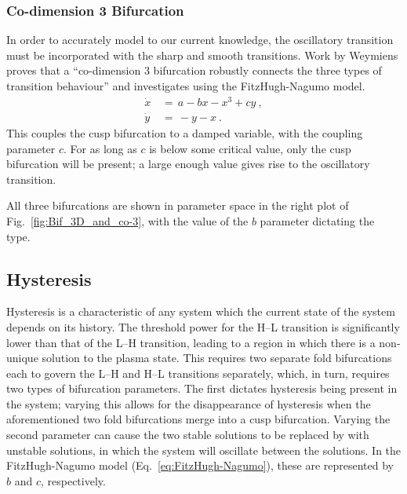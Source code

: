 \subsubsection{Co-dimension 3 Bifurcation}
In order to accurately model to our current knowledge, the oscillatory transition must be incorporated with the sharp and smooth transitions.
Work by Weymiens \cite{weymiens_bifurcation_2014} proves that a ``co-dimension 3 bifurcation robustly connects the three types of transition behaviour'' and investigates using the FitzHugh-Nagumo model.
\begin{subequations}
\begin{align} %
	\dot{x} \,&=\, a - bx - x^3 + cy~, \\
	\dot{y} \,&=\, -y - x~.
\end{align}
	\label{eq:FitzHugh-Nagumo}
\end{subequations}
This couples the cusp bifurcation to a damped variable, with the coupling parameter $c$.
For as long as $c$ is below some critical value, only the cusp bifurcation will be present; a large enough value gives rise to the oscillatory transition.

All three bifurcations are shown in parameter space in the right plot of Fig.~\ref{fig:Bif_3D_and_co-3}, with the value of the $b$ parameter dictating the type.

\subsection{Hysteresis}\label{ssec:hysteresis}
Hysteresis is a characteristic of any system which the current state of the system depends on its history.
The threshold power for the H--L transition is significantly lower than that of the L--H transition, leading to a region in which there is a non-unique solution to the plasma state.
This requires two separate fold bifurcations each to govern the L--H and H--L transitions separately, which, in turn, requires two types of bifurcation parameters.
The first dictates hysteresis being present in the system; varying this allows for the disappearance of hysteresis when the aforementioned two fold bifurcations merge into a cusp bifurcation.
Varying the second parameter can cause the two stable solutions to be replaced by with unstable solutions, in which the system will oscillate between the solutions.
In the FitzHugh-Nagumo model (Eq.~\ref{eq:FitzHugh-Nagumo}), these are represented by $b$ and $c$, respectively.
\todo{\color{red}{What to do here?}}

